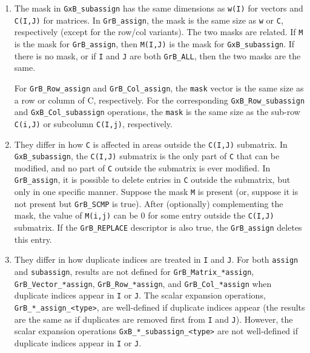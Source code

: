 \documentclass[12pt]{article}
\begin{document}
\begin{enumerate}
\item
    The mask in \verb'GxB_subassign' has the same dimensions as \verb'w(I)' for
    vectors and \verb'C(I,J)' for matrices.  In \verb'GrB_assign', the mask is
    the same size as \verb'w' or \verb'C', respectively (except for the row/col
    variants).  The two masks are related.  If \verb'M' is the mask for
    \verb'GrB_assign', then \verb'M(I,J)' is the mask for \verb'GxB_subassign'.
    If there is no mask, or if \verb'I' and \verb'J' are both \verb'GrB_ALL',
    then the two masks are the same.

    For \verb'GrB_Row_assign' and \verb'GrB_Col_assign', the \verb'mask' vector
    is the same size as a row or column of C, respectively.  For the
    corresponding \verb'GxB_Row_subassign' and \verb'GxB_Col_subassign'
    operations, the \verb'mask' is the same size as the sub-row \verb'C(i,J)' or
    subcolumn \verb'C(I,j)', respectively.

\item
    They differ in how \verb'C' is affected in areas outside the \verb'C(I,J)'
    submatrix.  In \verb'GxB_subassign', the \verb'C(I,J)' submatrix is the
    only part of \verb'C' that can be modified, and no part of \verb'C' outside
    the submatrix is ever modified.  In \verb'GrB_assign', it is possible to
    delete entries in \verb'C' outside the submatrix, but only in one specific
    manner.  Suppose the mask \verb'M' is present (or, suppose it is not
    present but \verb'GrB_SCMP' is true).  After (optionally) complementing the
    mask, the value of \verb'M(i,j)' can be 0 for some entry outside the
    \verb'C(I,J)' submatrix.  If the \verb'GrB_REPLACE' descriptor is also
    true, the \verb'GrB_assign' deletes this entry.

\item
    They differ in how duplicate indices are treated in \verb'I' and \verb'J'.
    For both \verb'assign' and \verb'subassign', results are not defined for
    \verb'GrB_Matrix_*assign', \verb'GrB_Vector_*assign',
    \verb'GrB_Row_*assign', and \verb'GrB_Col_*assign' when duplicate indices
    appear in \verb'I' or \verb'J'.  The scalar expansion operations,
    \verb'GrB_*_assign_<type>', are well-defined if duplicate indices appear
    (the results are the same as if duplicates are removed first from \verb'I'
    and \verb'J').  However, the scalar expansion operations
    \verb'GxB_*_subassign_<type>' are not well-defined if duplicate indices
    appear in \verb'I' or \verb'J'.

\end{enumerate}
\end{document}
